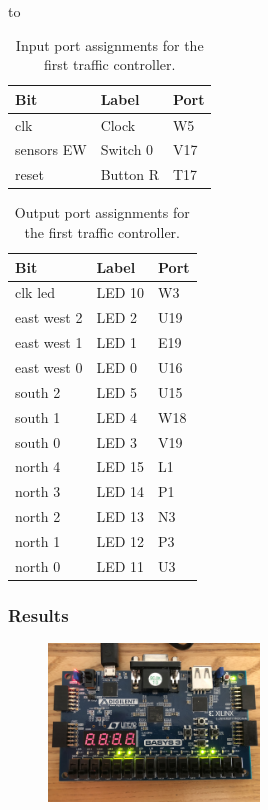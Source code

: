 to\documentclass[11pt]{article}
\begin{document}
\begin{table}[H]
\begin{center}
\begin{tabular}{| l | l | l |}
	\hline
	Bit & Label & Port \\ \hline
	clk & Clock & W5 \\ \hline
	sensors EW & Switch 0 & V17 \\ \hline
	reset & Button R & T17 \\ \hline
\end{tabular}
\caption{\label{tab:part1_input_Ports}Input port assignments for  the first traffic controller.}
\end{center}
\end{table}

\begin{table}[H]
\begin{center}
\begin{tabular}{| l | l | l |}
	\hline
	Bit & Label & Port \\ \hline
	clk led & LED 10 & W3 \\ \hline
	east west 2 & LED 2 & U19 \\ \hline
	east west 1 & LED 1 & E19 \\ \hline
	east west 0 & LED 0 & U16 \\ \hline
	south 2 & LED 5 & U15 \\ \hline
	south 1 & LED 4 & W18 \\ \hline
	south 0 & LED 3 & V19 \\ \hline
	north 4 & LED 15 & L1 \\ \hline
	north 3 & LED 14 & P1 \\ \hline
	north 2 & LED 13 & N3 \\ \hline
	north 1 & LED 12 & P3 \\ \hline
	north 0 & LED 11 & U3 \\ \hline
\end{tabular}
\caption{\label{tab:part1_output_Ports}Output port assignments for the first traffic controller.}
\end{center}
\end{table}

\subsubsection{Results}


\begin{figure}[H]
\begin{center}
	\includegraphics[width=0.5\textwidth]{./images/Part1/l9p1img1.jpg}
	\caption{\label{fig:part1_img1}}
\end{center}
\end{figure}
\end{document}
